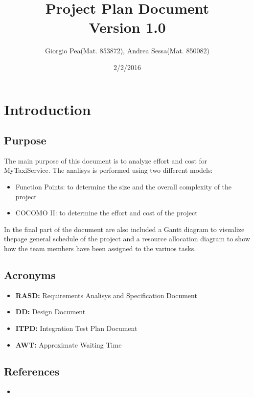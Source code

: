 \documentclass[11pt,titlepage]{article} %
\title{Project Plan Document \\ \vspace{1cm} \large{Version 1.0}}
\author{Giorgio Pea(Mat. 853872), Andrea Sessa(Mat. 850082)}
\date{2/2/2016}
\begin{document}
\maketitle

\newpage

\tableofcontents

\newpage

\section{Introduction}
  \subsection{Purpose}
    The main purpose of this document is to analyze effort and cost for MyTaxiService.
    The analisys is performed using two different models:
    \begin{itemize}
     \item Function Points: to determine the size and the overall complexity of the project
     \item COCOMO II: to determine the effort and cost of the project
    \end{itemize}
    In the final part of the document are also included a Gantt diagram to visualize thepage
    general schedule of the project and a resource allocation diagram to show how the team 
    members have been assigned to the variuos tasks.

  \subsection{Acronyms}
    \begin{itemize}
     \item \textbf{RASD:} Requirements Analisys and Specification Document
     \item \textbf{DD:} Design Document
     \item \textbf{ITPD:} Integration Test Plan Document
     \item \textbf{AWT:} Approximate Waiting Time
    \end{itemize}
  \subsection{References}
    \begin{itemize}
     \item 
    \end{itemize}
\end{document}
